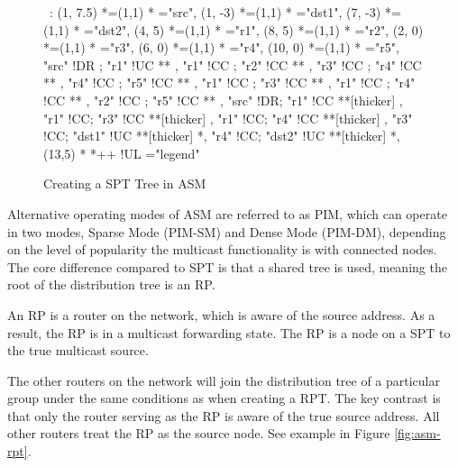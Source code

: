 \begin{figure}[Hp]
\label{fig:asm-spt}

\begin{center}

\ \xy<1cm,0cm>:
(1, 7.5)  *=(1,1) 	  	*\frm{-}  ="src",
(1, -3)   *=(1,1) 	*\frm{-}  ="dst1",
(7, -3)   *=(1,1) 	*\frm{-}  ="dst2",
%
(4,  5)   *=(1,1)  *   ="r1",
(8,  5)   *=(1,1)  *   ="r2",
(2,  0)   *=(1,1)  *   ="r3",
(6,  0)   *=(1,1)  *   ="r4",
(10, 0)   *=(1,1)  *   ="r5",
%
"src" !DR ; "r1" !UC **\dir{~} ,
%
"r1" !CC ; "r2" !CC **\dir{~} ,
"r3" !CC ; "r4" !CC **\dir{~} ,
"r4" !CC ; "r5" !CC **\dir{~} ,
"r1" !CC ; "r3" !CC **\dir{~} ,
"r1" !CC ; "r4" !CC **\dir{~} ,
"r2" !CC ; "r5" !CC **\dir{~} ,
%
"src" !DR; "r1"   !CC **[thicker]\dir{=} ,
"r1"  !CC; "r3"   !CC **[thicker]\dir{=} ,
"r1"  !CC; "r4"   !CC **[thicker]\dir{=} ,
"r3"  !CC; "dst1" !UC **[thicker]\dir{=} *,
"r4"  !CC; "dst2" !UC **[thicker]\dir{=} *,
%
\POS (13,5) * *++\frm{-} !UL ="legend"
\endxy

\end{center}

\caption{Creating a SPT Tree in ASM}

\end{figure}


Alternative operating modes of ASM are referred to as PIM, which
can operate in two modes, Sparse Mode (PIM-SM) and Dense Mode (PIM-DM),
depending on the level of popularity the multicast functionality is with
connected nodes. The core difference compared to SPT is that a shared
tree is used, meaning the root of the distribution tree is an RP.


An RP is a router on the network, which is aware of the source address.
As a result, the RP is in a multicast forwarding state. The RP is a node
on a SPT to the true multicast source.


The other routers on the network will join the distribution tree of a 
particular  group under the same conditions as when creating a RPT. The 
key contrast is that only the router serving as the RP is aware of the 
true source address. All other routers treat the RP as the source node. 
See example in Figure \ref{fig:asm-rpt}.


